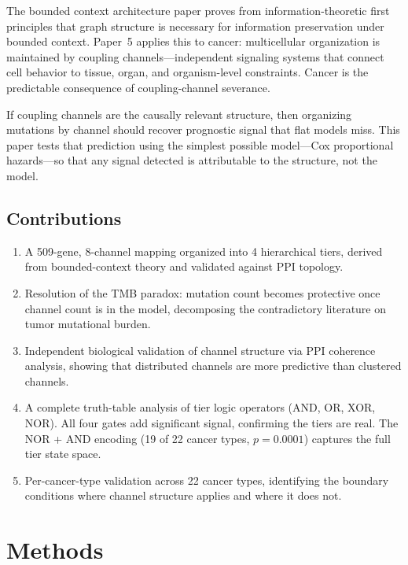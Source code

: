 \documentclass[11pt]{article}
\begin{document}
The bounded context architecture paper \cite{McCarthy2026_BCA} proves from
information-theoretic first principles that graph structure is
necessary for information preservation under bounded context.
Paper~5 \cite{McCarthy2026e} applies this to cancer:
multicellular organization is maintained by coupling
channels---independent signaling systems that connect cell
behavior to tissue, organ, and organism-level constraints. Cancer
is the predictable consequence of coupling-channel severance.

If coupling channels are the causally relevant structure, then
organizing mutations by channel should recover prognostic signal
that flat models miss. This paper tests that prediction using the
simplest possible model---Cox proportional hazards---so that any
signal detected is attributable to the structure, not the model.

\subsection{Contributions}

\begin{enumerate}
\item A 509-gene, 8-channel mapping organized into 4 hierarchical
   tiers, derived from bounded-context theory and validated against
   PPI topology.
\item Resolution of the TMB paradox: mutation count becomes
   protective once channel count is in the model, decomposing
   the contradictory literature on tumor mutational burden.
\item Independent biological validation of channel structure via
   PPI coherence analysis, showing that distributed channels are
   more predictive than clustered channels.
\item A complete truth-table analysis of tier logic operators
   (AND, OR, XOR, NOR). All four gates add significant signal,
   confirming the tiers are real. The NOR + AND encoding
   (19 of 22 cancer types, $p = 0.0001$) captures the full
   tier state space.
\item Per-cancer-type validation across 22 cancer types,
   identifying the boundary conditions where channel structure
   applies and where it does not.
\end{enumerate}

\section{Methods}
\label{sec:methods}
\end{document}
